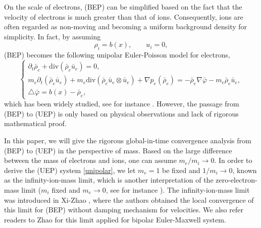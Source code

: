 \documentclass[reqno,twoside,12pt,a4paper]{amsart}
\newcommand{\pt}{\partial_t}
\newcommand{\vp}{\varphi}
\numberwithin{equation}{section}
\begin{document}
On the scale of electrons, (BEP) can be simplified based on the fact that the velocity of electrons is much greater than that of ions. Consequently, ions are often regarded as non-moving and becoming a uniform background density for simplicity. In fact, by assuming 
\[
\rho_i=b(x),\qquad u_i=0,
\] 
(BEP) becomes the following unipolar Euler-Poisson model for electrons,
\begin{equation}\label{unipolar}
\begin{cases}
\pt\bar{\rho}_{e}+\mathrm{div}\left(\bar{\rho}_{e}\bar{u}_{e}\right)=0,
\\
m_{e}\pt\left(\bar{\rho}_{e}\bar{u}_{e}\right)+m_{e}\mathrm{div}\left(\bar{\rho}_{e}\bar{u}_{e}\otimes \bar{u}_{e}\right)+\nabla p_e(\bar{\rho}_e)=-\bar{\rho}_e\nabla \bar{\vp}-m_e \bar{\rho}_e \bar{u}_e,\\
\triangle \bar{\vp}=b(x)-\bar{\rho}_e,
\end{cases}
\end{equation}
which has been widely studied, see for instance \cite{Ali2000, Guo1998, Hsiao2003, Peng2015}. However, the passage from (BEP) to (UEP) is only based on physical observations and lack of  rigorous mathematical proof. 

In this paper, we will give the rigorous global-in-time convergence analysis from (BEP) to (UEP) in the perspective of mass. Based on the large difference between the mass of electrons and ions, one can assume $m_e/m_i \rightarrow 0$. In order to derive the (UEP) system \eqref{unipolar}, we let $m_e=1$ be fixed and $1/m_i\to 0$, known as the infinity-ion-mass limit, which is another interpretation of the zero-electron-mass limit ($m_i$ fixed and $m_e\to 0$, see for instance \cite{Ali2011,Giuseppe2010,Goudon1999,Peng2015,Xu2011}). The infinity-ion-mass limit was introduced in Xi-Zhao \cite {Xi2020}, where the authors obtained the local convergence of this limit for (BEP) without damping mechanism for velocities. We also refer readers to Zhao \cite{Zhao2021a} for this limit applied for bipolar Euler-Maxwell system. 
\end{document}

